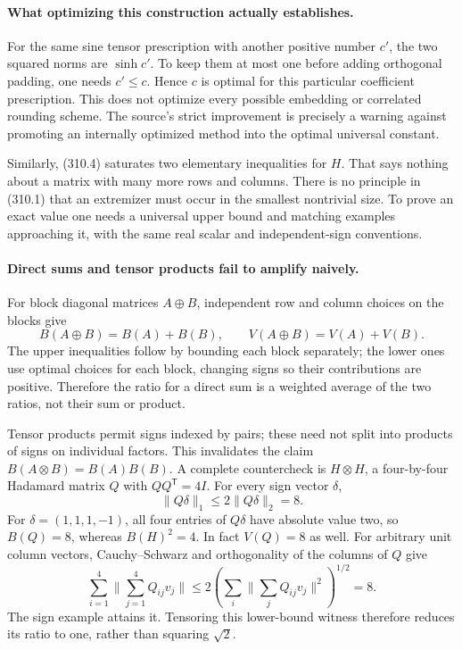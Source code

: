 \documentclass[11pt]{article}
\begin{document}
\paragraph{What optimizing this construction actually establishes.}
For the same sine tensor prescription with another positive number
$c'$, the two squared norms are $\sinh c'$. To keep them at most
one before adding orthogonal padding, one needs $c'\leq c$. Hence
$c$ is optimal for this particular coefficient prescription. This
does not optimize every possible embedding or correlated rounding
scheme. The source's strict improvement is precisely a warning
against promoting an internally optimized method into the optimal
universal constant.

Similarly, (310.4) saturates two elementary inequalities for $H$.
That says nothing about a matrix with many more rows and columns.
There is no principle in (310.1) that an extremizer must occur in
the smallest nontrivial size. To prove an exact value one needs a
universal upper bound and matching examples approaching it, with
the same real scalar and independent-sign conventions.

\paragraph{Direct sums and tensor products fail to amplify naively.}
For block diagonal matrices $A\oplus B$, independent row and column
choices on the blocks give
\[
 B(A\oplus B)=B(A)+B(B),\qquad
 V(A\oplus B)=V(A)+V(B).
\]
The upper inequalities follow by bounding each block separately;
the lower ones use optimal choices for each block, changing signs
so their contributions are positive. Therefore the ratio for a
direct sum is a weighted average of the two ratios, not their sum
or product.

Tensor products permit signs indexed by pairs; these need not split
into products of signs on individual factors. This invalidates the
claim $B(A\otimes B)=B(A)B(B)$. A complete countercheck is
$H\otimes H$, a four-by-four Hadamard matrix $Q$ with
$QQ^{\mathsf T}=4I$. For every sign vector $\delta$,
\[
 \|Q\delta\|_1\leq2\|Q\delta\|_2=8.
\]
For $\delta=(1,1,1,-1)$, all four entries of $Q\delta$ have
absolute value two, so $B(Q)=8$, whereas $B(H)^2=4$.
In fact $V(Q)=8$ as well. For arbitrary unit column vectors,
Cauchy--Schwarz and orthogonality of the columns of $Q$ give
\[
 \sum_{i=1}^4\Big\|\sum_{j=1}^4Q_{ij}v_j\Big\|
 \leq2\left(\sum_i\Big\|\sum_jQ_{ij}v_j\Big\|^2\right)^{1/2}
 =8.
\]
The sign example attains it. Tensoring this lower-bound witness
therefore reduces its ratio to one, rather than squaring $\sqrt2$.
\end{document}
